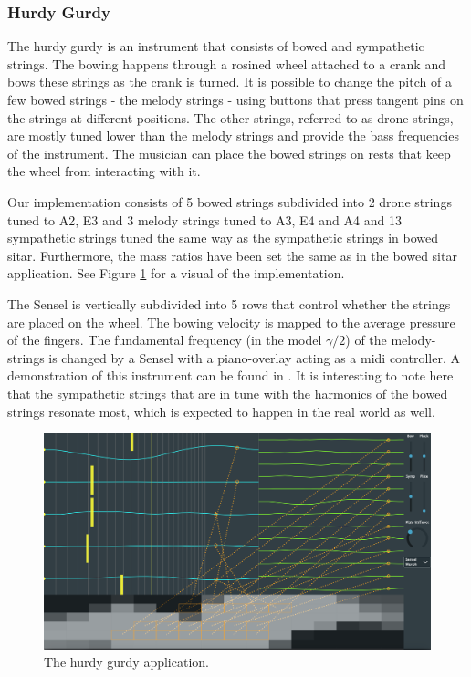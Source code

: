 \documentclass{article}
\begin{document}
\subsubsection{Hurdy Gurdy}
The hurdy gurdy is an instrument that consists of bowed and sympathetic strings. The bowing happens through a rosined wheel attached to a crank and bows these strings as the crank is turned. It is possible to change the pitch of a few bowed strings - the melody strings - using buttons that press tangent pins on the strings at different positions. The other strings, referred to as drone strings, are mostly tuned lower than the melody strings and provide the bass frequencies of the instrument. The musician can place the bowed strings on rests that keep the wheel from interacting with it. 

Our implementation consists of 5 bowed strings subdivided into 2 drone strings tuned to A2, E3 and 3 melody strings tuned to A3, E4 and A4 and 13 sympathetic strings tuned the same way as the sympathetic strings in bowed sitar. Furthermore, the mass ratios have been set the same as in the bowed sitar application. See Figure \ref{fig:hurdyGurdy} for a visual of the implementation.

The Sensel is vertically subdivided into 5 rows that control whether the strings are placed on the wheel. The bowing velocity is mapped to the average pressure of the fingers. The fundamental frequency (in the model $\gamma / 2$) of the melody-strings is changed by a Sensel with a piano-overlay acting as a midi controller. A demonstration of this instrument can be found in \cite{video}. It is interesting to note here that the sympathetic strings that are in tune with the harmonics of the bowed strings resonate most, which is expected to happen in the real world as well.

\begin{figure}[h]
\centering
\includegraphics[width=1.0\columnwidth]{HurdyGurdy.png}
\caption{The hurdy gurdy application. \label{fig:hurdyGurdy}}
\end{figure}
\end{document}
